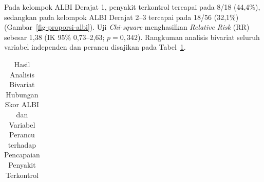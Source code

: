 \documentclass[
  indonesian,
]{report}
\begin{document}
Pada kelompok ALBI Derajat 1, penyakit terkontrol tercapai pada 8/18
(44,4\%), sedangkan pada kelompok ALBI Derajat 2--3 tercapai pada 18/56
(32,1\%) (Gambar~\ref{fig-proporsi-albi}). Uji \emph{Chi-square}
menghasilkan \emph{Relative Risk} (RR) sebesar 1,38 (IK 95\% 0,73--2,63;
\(p = 0,342\)). Rangkuman analisis bivariat seluruh variabel independen
dan perancu disajikan pada Tabel~\ref{tbl-bivariat}.

{

\begin{longtable}[]{@{}
  >{\raggedright\arraybackslash}p{}
  >{\raggedleft\arraybackslash}p{}
  >{\raggedright\arraybackslash}p{}
  >{\raggedright\arraybackslash}p{}
  >{\raggedright\arraybackslash}p{}
  >{\raggedright\arraybackslash}p{}
  >{\raggedright\arraybackslash}p{}
  >{\raggedright\arraybackslash}p{}@{}}

\caption{\label{tbl-bivariat}Hasil Analisis Bivariat Hubungan Skor ALBI
dan Variabel Perancu terhadap Pencapaian Penyakit Terkontrol}

\tabularnewline


\end{longtable}}
\end{document}
